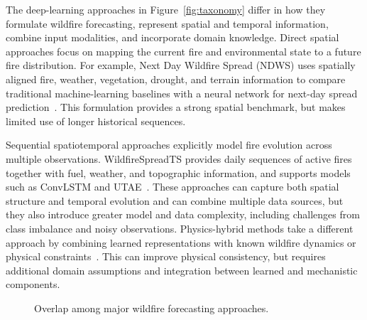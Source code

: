 \documentclass[sigconf]{acmart}
\begin{document}
The deep-learning approaches in Figure~\ref{fig:taxonomy} differ in how they formulate wildfire forecasting, represent spatial and temporal information, combine input modalities, and incorporate domain knowledge. Direct spatial approaches focus on mapping the current fire and environmental state to a future fire distribution. For example, Next Day Wildfire Spread (NDWS) uses spatially aligned fire, weather, vegetation, drought, and terrain information to compare traditional machine-learning baselines with a neural network for next-day spread prediction~\cite{HUOT2022NDWS}. This formulation provides a strong spatial benchmark, but makes limited use of longer historical sequences.

Sequential spatiotemporal approaches explicitly model fire evolution across multiple observations. WildfireSpreadTS provides daily sequences of active fires together with fuel, weather, and topographic information, and supports models such as ConvLSTM and UTAE~\cite{GERARD2023WILDFIRESPREADTS}. These approaches can capture both spatial structure and temporal evolution and can combine multiple data sources, but they also introduce greater model and data complexity, including challenges from class imbalance and noisy observations. Physics-hybrid methods take a different approach by combining learned representations with known wildfire dynamics or physical constraints~\cite{VOGIATZOGLOU2025}. This can improve physical consistency, but requires additional domain assumptions and integration between learned and mechanistic components.

\begin{figure}[!ht]
    \centering


    \caption{Overlap among major wildfire forecasting approaches.}
    \label{fig:venn}
\end{figure}
\end{document}
